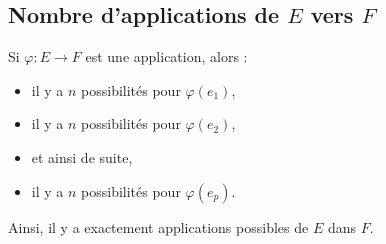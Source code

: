             \subsection{Nombre d'applications de $E$ vers $F$}
            Si $\varphi : E \rightarrow F $ 
            est une application, alors :
            \begin{itemize}
                  \item il y a $n$ possibilit\'es pour $\varphi(e_1)$,
                  \item il y a $n$ possibilit\'es pour $\varphi(e_2)$,
                  \item et ainsi de suite,
                  \item il y a $n$ possibilit\'es pour $\varphi(e_p)$.
            \end{itemize}
            Ainsi, il y a exactement  applications possibles de $E$ dans $F$.
